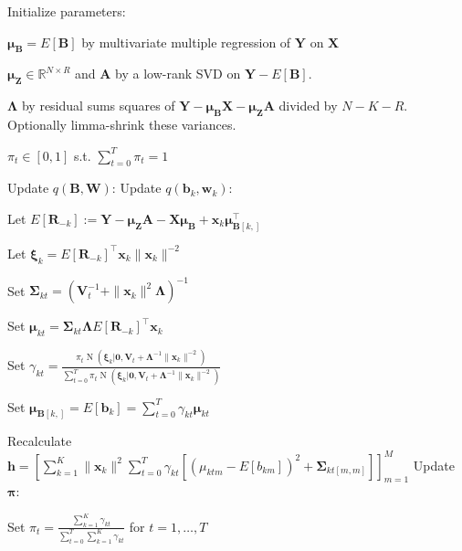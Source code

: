 \documentclass[11pt,authoryear]{article}
\DeclareMathOperator*{\N}{N}
\newcommand{\bs}[1]{\boldsymbol{#1}}
\begin{document}
\begin{algorithm}
\begin{algorithmic}
  \STATE Initialize parameters:
  \begin{description}
  \item $\bs{\mu}_{\bs{B}} = E[\bs{B}]$ by multivariate multiple regression of $\bs{Y}$ on $\bs{X}$
  \item $\bs{\mu}_{\bs{Z}} \in \mathbb{R}^{N \times R}$ and $\bs{A}$ by a low-rank SVD on $\bs{Y} - E[\bs{B}]$.
  \item $\bs{\Lambda}$ by residual sums squares of $\bs{Y} - \bs{\mu}_{\bs{B}}\bs{X} - \bs{\mu}_{\bs{Z}}\bs{A}$ divided by $N - K - R$. Optionally limma-shrink these variances.
  \item $\pi_t \in [0, 1]$ s.t. $\sum_{t = 0}^T\pi_t = 1$
  \end{description}
  \REPEAT
  \STATE Update $q(\bs{B},\bs{W})$:
  \STATE Update $q(\bs{b}_k,\bs{w}_k)$:
  \begin{description}
  \item Let $E[\bs{R}_{-k}] := \bs{Y} - \bs{\mu}_{\bs{Z}}\bs{A} - \bs{X}\bs{\mu}_{\bs{B}} + \bs{x}_k\bs{\mu}_{\bs{B}[k, ]}^{\intercal}$
  \item Let $\bs{\xi}_k = E\left[\bs{R}_{-k}\right]^{\intercal}\bs{x}_k\|\bs{x}_k\|^{-2}$
  \item Set $\bs{\Sigma}_{kt} = \left(\bs{V}_t^{-1} + \|\bs{x}_k\|^2\bs{\Lambda}\right)^{-1}$
  \item Set $\bs{\mu}_{kt} = \bs{\Sigma}_{kt}\bs{\Lambda}E\left[\bs{R}_{-k}\right]^{\intercal}\bs{x}_k$
  \item Set $\gamma_{kt} = \frac{\pi_t\N(\bs{\xi}_k|\bs{0}, \bs{V}_t + \bs{\Lambda}^{-1}\|\bs{x}_k\|^{-2})}{\sum_{t = 0}^T\pi_t\N(\bs{\xi}_k|\bs{0}, \bs{V}_t + \bs{\Lambda}^{-1}\|\bs{x}_k\|^{-2})}$
    \ENDFOR
  \item Set $\bs{\mu}_{\bs{B}[k, ]} = E[\bs{b}_{k}] = \sum_{t = 0}^T \gamma_{kt}\bs{\mu}_{kt}$
  \end{description}
  \ENDFOR
  \STATE Recalculate $\bs{h} = \left[\sum_{k = 1}^K\|\bs{x}_k\|^2\sum_{t = 0}^T\gamma_{kt}\left[\left(\mu_{ktm} - E[b_{km}]\right)^2 + \bs{\Sigma}_{kt[m, m]}\right]\right]_{m = 1}^{M}$
  \STATE Update $\bs{\pi}$:
  \begin{description}
  \item Set $\pi_t = \frac{\sum_{k = 1}^K\gamma_{kt}}{\sum_{t = 0}^T\sum_{k = 1}^K\gamma_{kt}}$ for $t = 1,\ldots, T$

\end{description}
\end{algorithmic}
\end{algorithm}
\end{document}
